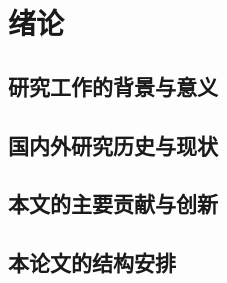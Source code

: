 \chapter{绪\hspace{6pt}论}

\section{研究工作的背景与意义}

\cite{ren2021accelerating}
\section{国内外研究历史与现状}
\section{本文的主要贡献与创新}
\section{本论文的结构安排}